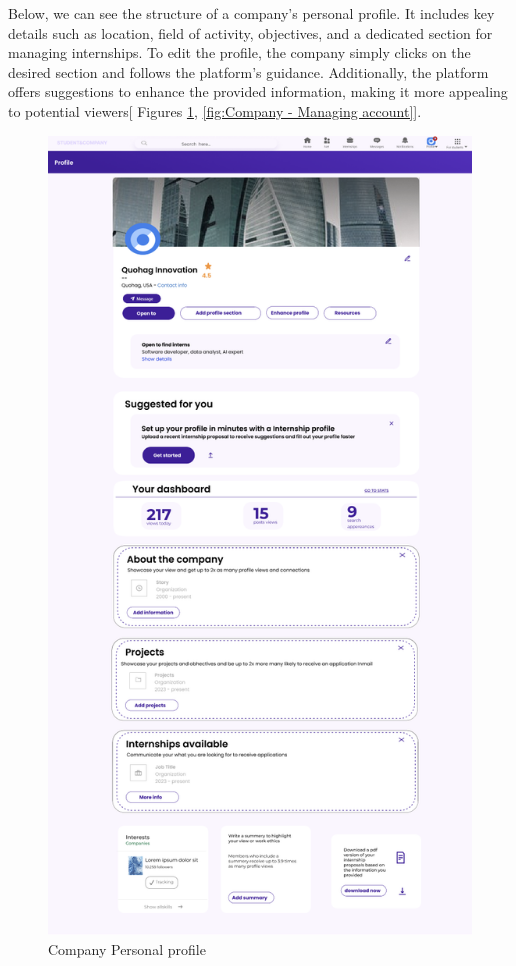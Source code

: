 Below, we can see the structure of a company's personal profile. It includes key details such as location, field of activity, objectives, and a dedicated section for managing internships. To edit the profile, the company simply clicks on the desired section and follows the platform's guidance. Additionally, the platform offers suggestions to enhance the provided information, making it more appealing to potential viewers[ Figures \ref{fig:Company Personal profile}, \ref{fig:Company - Managing account}].


\begin{figure} [H]
    \centering
    \includegraphics[width=0.5\linewidth]{Images/Interface Images/company interface/Screenshot 2024-12-12 045502.png}
    \caption{Company Personal profile}
    \label{fig:Company Personal profile}
\end{figure}

